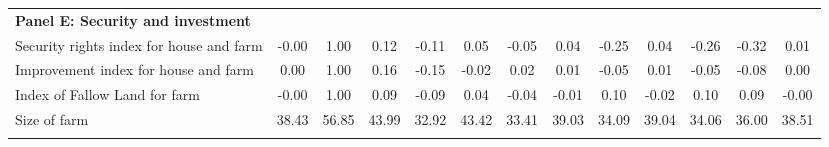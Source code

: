 \begin{tabular}{lcccccccccccc}
\textbf{Panel E: Security and investment} &  &  &  &  &  &  &  &  &  &  &  & \\
Security rights index for house and farm & -0.00 & 1.00 & 0.12 & -0.11 & 0.05 & -0.05 & 0.04 & -0.25 & 0.04 & -0.26 & -0.32 & 0.01\\
Improvement index for house and farm & 0.00 & 1.00 & 0.16 & -0.15 & -0.02 & 0.02 & 0.01 & -0.05 & 0.01 & -0.05 & -0.08 & 0.00\\
Index of Fallow Land for farm & -0.00 & 1.00 & 0.09 & -0.09 & 0.04 & -0.04 & -0.01 & 0.10 & -0.02 & 0.10 & 0.09 & -0.00\\
Size of farm & 38.43 & 56.85 & 43.99 & 32.92 & 43.42 & 33.41 & 39.03 & 34.09 & 39.04 & 34.06 & 36.00 & 38.51\\
\noalign{\smallskip}\hline\end{tabular}
